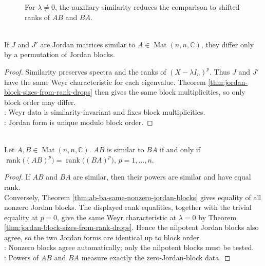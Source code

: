 \begin{figure}[H]
  \centering
  
  \caption{For $\lambda\neq0$, the auxiliary similarity reduces the comparison to shifted ranks of $AB$ and $BA$.}
  \label{fig:ab-ba-nonzero-jordan-blocks}
\end{figure}

\begin{corollary} \label{cor:jordan-form-unique-up-to-block-permutation} \\
If $J$ and $J'$ are Jordan matrices similar to $A\in\operatorname{Mat}(n,n,\mathbb{C})$, they differ only by a permutation of Jordan blocks.
\begin{proof}
Similarity preserves spectra and the ranks of $(X-\lambda I_n)^p$. Thus $J$ and $J'$ have the same Weyr characteristic for each eigenvalue. Theorem \ref{thm:jordan-block-sizes-from-rank-drops} then gives the same block multiplicities, so only block order may differ.\\
: Weyr data is similarity-invariant and fixes block multiplicities.\\
: Jordan form is unique modulo block order.
\end{proof}
\end{corollary}

\begin{corollary} \label{cor:ab-ba-similar-rank-power-criterion} \\
Let $A,B\in\operatorname{Mat}(n,n,\mathbb{C})$. $AB$ is similar to $BA$ if and only if $\operatorname{rank}\bigl((AB)^p\bigr)=\operatorname{rank}\bigl((BA)^p\bigr)$, $p=1,\ldots,n$.
\begin{proof}
If $AB$ and $BA$ are similar, then their powers are similar and have equal rank.\\
Conversely, Theorem \ref{thm:ab-ba-same-nonzero-jordan-blocks} gives equality of all nonzero Jordan blocks. The displayed rank equalities, together with the trivial equality at $p=0$, give the same Weyr characteristic at $\lambda=0$ by Theorem \ref{thm:jordan-block-sizes-from-rank-drops}. Hence the nilpotent Jordan blocks also agree, so the two Jordan forms are identical up to block order.\\
: Nonzero blocks agree automatically; only the nilpotent blocks must be tested.\\
: Powers of $AB$ and $BA$ measure exactly the zero-Jordan-block data.
\end{proof}
\end{corollary}

